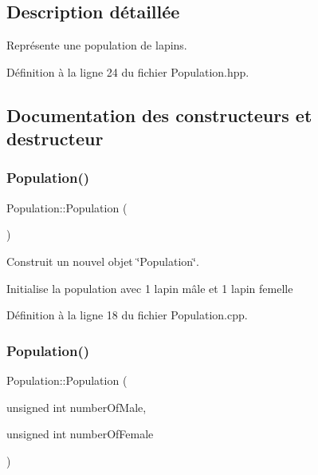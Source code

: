 \subsection{Description détaillée}
Représente une population de lapins. 

Définition à la ligne 24 du fichier Population.\+hpp.



\subsection{Documentation des constructeurs et destructeur}
\mbox{\label{classPopulation_a54eb24ca89470eebe0c27bcb03a0ceae}} 
\subsubsection{\texorpdfstring{Population()}{Population()}\hspace{0.1cm}{\footnotesize\ttfamily [1/2]}}
{\footnotesize\ttfamily Population\+::\+Population (\begin{DoxyParamCaption}{ }\end{DoxyParamCaption})}



Construit un nouvel objet \char`\"{}\+Population\char`\"{}. 

Initialise la population avec 1 lapin mâle et 1 lapin femelle 

Définition à la ligne 18 du fichier Population.\+cpp.

\mbox{\label{classPopulation_a8bf0924406fb56bb5177016d5ebd7911}} 
\subsubsection{\texorpdfstring{Population()}{Population()}\hspace{0.1cm}{\footnotesize\ttfamily [2/2]}}
{\footnotesize\ttfamily Population\+::\+Population (\begin{DoxyParamCaption}\item[{unsigned int}]{number\+Of\+Male,  }\item[{unsigned int}]{number\+Of\+Female }\end{DoxyParamCaption})}



